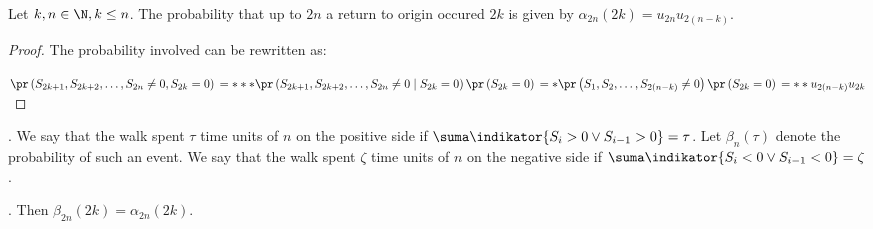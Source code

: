 \begin{thm}\label{thm-arcsine_last_visits}
 Let $k,n \in \N, k\leq n$.
 The probability that up to \Time $2n$ a return to origin occured \intime $2k$ is given by
 $\alpha_{2n} \left( 2k \right) =u_{2n}u_{2 \left( n-k \right) }$.
\end{thm}
\begin{proof}
 The probability involved can be rewritten as:

 $\pr \left( S_{2k+1}, S_{2k+2}, \ldots, S_{2n}\neq 0, S_{2k}=0 \right)\\
 =***\pr \left( S_{2k+1}, S_{2k+2}, \ldots, S_{2n}\neq 0\mid S_{2k}=0 \right) \pr \left( S_{2k}=0 \right)\\
 =*\pr \left( S_{1}, S_{2}, \ldots, S_{2 \left( n-k \right) }\neq 0 \right) \pr \left( S_{2k}=0 \right)\\
 =**u_{2 \left( n-k \right) }u_{2k}$
\end{proof}
\begin{defn}
 \Lrw. We say that the walk spent $\tau$ time units of $n$ on the positive side if $\suma \indikator{S_i>0 \lor S_{i-1}>0}=\tau$.
 Let $\beta_{n} \left( \tau \right) $ denote the probability of such an event.
 We say that the walk spent $\zeta$ time units of $n$ on the negative side if
 $\suma\indikator{S_i<0 \lor S_{i-1}<0}=\zeta$.
\end{defn}
\begin{thm}\label{thm-arcsine_sojourn_times}
 \Lrws. Then $\beta_{2n} \left( 2k \right) =\alpha_{2n} \left( 2k \right) $.
\end{thm}
